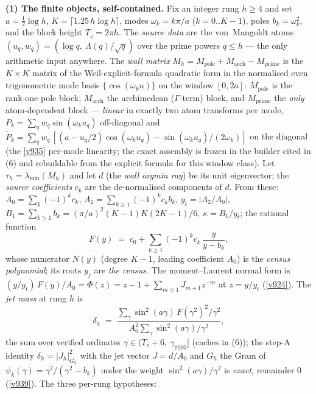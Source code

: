 \documentclass[11pt,a4paper]{article}
\begin{document}
\par\smallskip\noindent\textbf{(1) The finite objects, self-contained.}  Fix an integer rung
$h \ge 4$ and set $a = \tfrac12\log h$, $K = \lceil 1.25\,h\log h\rceil$, modes
$\omega_k = k\pi/a$ ($k = 0..K{-}1$), poles $b_k = \omega_k^2$, and the block height
$T_z = 2\pi h$.  The \emph{source data} are the von~Mangoldt atoms
$(u_q, w_q) = (\log q,\ \Lambda(q)/\sqrt q)$ over the prime powers $q \le h$ --- the only
arithmetic input anywhere.  The \emph{wall matrix} $M_h = M_{\mathrm{pole}} + M_{\mathrm{arch}}
- M_{\mathrm{prime}}$ is the $K\times K$ matrix of the Weil-explicit-formula quadratic form in
the normalised even trigonometric mode basis $\{\cos(\omega_k u)\}$ on the window $[0, 2a]$:
$M_{\mathrm{pole}}$ is the rank-one pole block, $M_{\mathrm{arch}}$ the archimedean
($\Gamma$-term) block, and $M_{\mathrm{prime}}$ the \emph{only} atom-dependent block ---
\emph{linear} in exactly two atom transforms per mode, $P_k = \sum_q w_q\sin(\omega_k u_q)$
off-diagonal and $\tilde P_k = \sum_q w_q\,[(a - u_q/2)\cos(\omega_k u_q) - \sin(\omega_k u_q)/
(2\omega_k)]$ on the diagonal (the \vref{v935} per-mode linearity; the exact assembly is frozen
in the builder cited in (6) and rebuildable from the explicit formula for this window class).
Let $\tau_h = \lambda_{\min}(M_h)$ and let $d$ (the \emph{wall argmin ray}) be its unit
eigenvector; the \emph{source coefficients} $c_k$ are the de-normalised components of $d$.
From these: $A_0 = \sum_k(-1)^k c_k$, $A_2 = \sum_{k\ge1}(-1)^k c_k b_k$,
$y_t = |A_2/A_0|$, $B_1 = \sum_{k\ge1} b_k = (\pi/a)^2(K{-}1)K(2K{-}1)/6$,
$\kappa = B_1/y_t$; the rational function
\[
  F(y) \;=\; c_0 + \sum_{k\ge1}(-1)^k c_k\,\frac{y}{y - b_k},
\]
whose numerator $N(y)$ (degree $K{-}1$, leading coefficient $A_0$) is the \emph{census
polynomial}; its roots $y_j$ are \emph{the census}.  The moment--Laurent normal form is
$(y/y_t)\,F(y)/A_0 = \Phi(z) = z - 1 + \sum_{m\ge1} J_{m+1} z^{-m}$ at $z = y/y_t$
(\vref{v924}).  The \emph{jet mass} at rung $h$ is
\[
  \delta_h \;=\; \frac{\sum_\gamma \sin^2(a\gamma)\,F(\gamma^2)^2/\gamma^2}
                      {A_0^2 \sum_\gamma \sin^2(a\gamma)/\gamma^2},
\]
the sum over verified ordinates $\gamma \in (T_z + 6,\ \gamma_{7000}]$ (caches in (6)); the
step-A identity $\delta_h = |J_h|^2_{G_h}$ with the jet vector $J = d/A_0$ and $G_h$ the Gram
of $\psi_k(\gamma) = \gamma^2/(\gamma^2 - b_k)$ under the weight $\sin^2(a\gamma)/\gamma^2$ is
\emph{exact}, remainder $0$ (\vref{v939}).  The three per-rung hypotheses:
\end{document}
